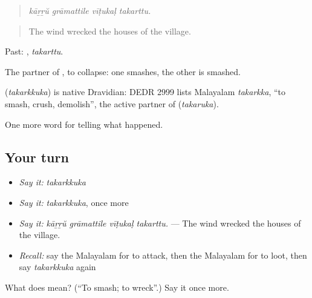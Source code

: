 \begin{quote}
\emph{kāṟṟŭ grāmattile vīṭukaḷ takarttu.}
\end{quote}

\begin{quote}
The wind wrecked the houses of the village.
\end{quote}

Past: , \emph{takarttu}.

The partner of , to collapse: one smashes, the other is smashed.

\begin{cousinweb}
\textbf{} (\emph{takarkkuka}) is native Dravidian: DEDR 2999 lists Malayalam \emph{takarkka}, \textquotedblleft{}to smash, crush, demolish\textquotedblright{}, the active partner of  (\emph{takaruka}).
\end{cousinweb}

\begin{grammarlens}[title={What you've built}]
One more word for telling what happened.
\end{grammarlens}

\subsection*{Your turn}
\begin{itemize}
\raggedright
  \item \emph{Say it:} \emph{takarkkuka}
  \item \emph{Say it:} \emph{takarkkuka}, once more
  \item \emph{Say it:} \emph{kāṟṟŭ grāmattile vīṭukaḷ takarttu.} — The wind wrecked the houses of the village.
  \item \emph{Recall:} say the Malayalam for to attack, then the Malayalam for to loot, then say \emph{takarkkuka} again
\end{itemize}

\begin{tcolorbox}[breakable,colback=teal!4,colframe=teal!35!black,title={Before you move on}]
What does  mean? (\textquotedblleft{}To smash; to wreck\textquotedblright{}.) Say it once more.
\end{tcolorbox}
